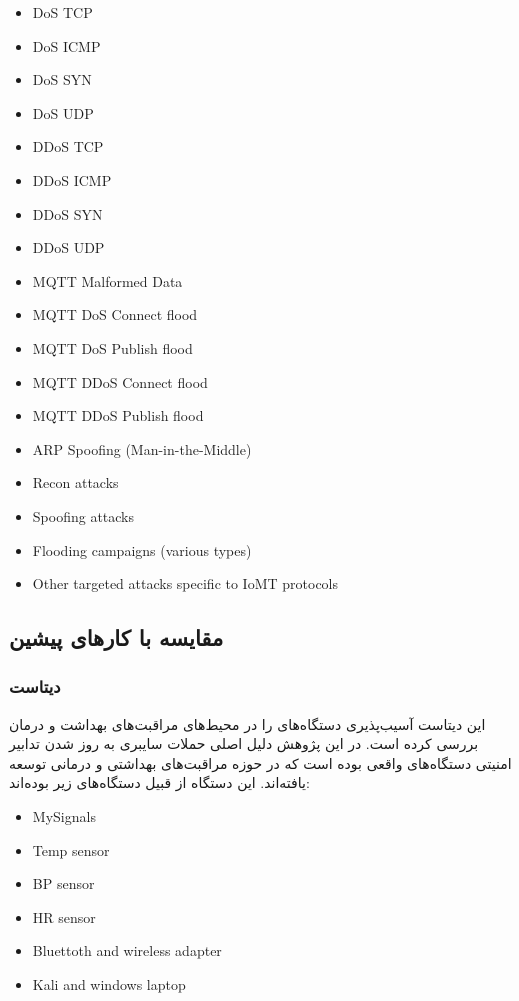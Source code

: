 \begin{LTR}
    \begin{itemize}
       \item DoS TCP
       \item DoS ICMP
       \item DoS SYN
       \item DoS UDP
       \item DDoS TCP
       \item DDoS ICMP
       \item DDoS SYN
       \item DDoS UDP
       \item MQTT Malformed Data
       \item MQTT DoS Connect flood
       \item MQTT DoS Publish flood
       \item MQTT DDoS Connect flood
       \item MQTT DDoS Publish flood
       \item ARP Spoofing (Man-in-the-Middle)
       \item Recon attacks
       \item Spoofing attacks
       \item Flooding campaigns (various types)
       \item Other targeted attacks specific to IoMT protocols
    \end{itemize}
\end{LTR}

\subsection{مقایسه  با کار‌های پیشین}

\subsubsection{دیتاست }

این دیتاست \cite{ahmed2021ecu} آسیب‌پذیری دستگاه‌های  را در محیط‌های
مراقبت‌های بهداشت و درمان بررسی کرده است. در این پژوهش دلیل اصلی حملات سایبری به
روز شدن تدابیر امنیتی دستگاه‌های واقعی بوده است که در حوزه مراقبت‌های بهداشتی و
درمانی توسعه یافته‌اند. این دستگاه از قبیل دستگاه‌های زیر بوده‌اند:

\begin{LTR}
    \begin{itemize}
        \item MySignals
        \item Temp sensor
        \item BP sensor
        \item HR sensor
        \item Bluettoth and wireless adapter
        \item Kali and windows laptop
    \end{itemize}
\end{LTR}

